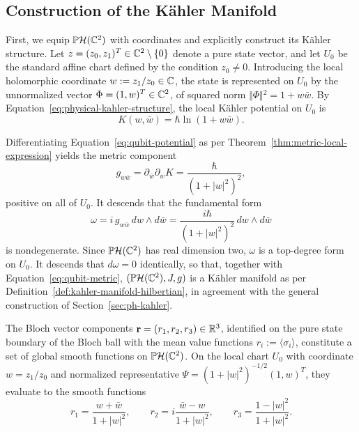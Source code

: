 \subsection*{Construction of the Kähler Manifold}

First, we equip $\PH(\C^2)$ with coordinates and explicitly construct its Kähler structure. Let $z = (z_0, z_1)^T \in \mathbb{C}^2 \setminus \{0\}$ denote a pure state vector, and let $U_0$ be the standard affine chart defined by the condition $z_0 \neq 0$. Introducing the local holomorphic coordinate $w := z_1/z_0 \in \mathbb{C}$, the state is represented on $U_0$ by the unnormalized vector $\Phi = (1, w)^T \in \mathbb{C}^2$, of squared norm $\Vert{}\Phi\Vert{}^2 = 1 + w\bar{w}$. By Equation~\eqref{eq:physical-kahler-structure}, the local Kähler potential on $U_0$ is
\begin{equation}
	K(w,\bar w)=\hbar\ln(1+w\bar w). \label{eq:qubit-potential}
\end{equation}

\noindent Differentiating Equation~\eqref{eq:qubit-potential} as per Theorem~\ref{thm:metric-local-expression} yields the metric component
\begin{equation}
	g_{w\bar w}=\partial_{\bar w}\partial_w K=\frac{\hbar}{(1+|w|^2)^2}, \label{eq:qubit-metric}
\end{equation}
positive on all of $U_0$. It descends that the fundamental form
\begin{equation}
	\boxed{\omega=i\,g_{w\bar w}\,dw\wedge d\bar w=\frac{i\hbar}{(1+|w|^2)^2}\,dw\wedge d\bar w} \label{eq:qubit-omega}
\end{equation}
is nondegenerate. Since $\PH(\C^2)$ has real dimension two, $\omega$ is a top-degree form on $U_0$. It descends that $d\omega=0$ identically, so that, together with Equation~\eqref{eq:qubit-metric}, $(\PH(\C^2),J,g)$ is a Kähler manifold as per Definition~\ref{def:kahler-manifold-hilbertian}, in agreement with the general construction of Section~\ref{sec:ph-kahler}.

\noindent The Bloch vector components $\mathbf{r}=(r_1,r_2,r_3) \in \mathbb{R}^3$, identified on the pure state boundary of the Bloch ball with the mean value functions $r_i := \langle\sigma_i\rangle$,  constitute a set of global smooth functions on $\PH(\mathbb{C}^2)$. On the local chart $U_0$ with coordinate $w = z_1/z_0$ and normalized representative $\Psi = (1+|w|^2)^{-1/2} (1, w)^T$, they evaluate to the smooth functions
\begin{equation}
	r_1 = \frac{w + \bar{w}}{1+|w|^2}, \qquad r_2 = i\frac{\bar{w} - w}{1+|w|^2}, \qquad r_3 = \frac{1 - |w|^2}{1+|w|^2}.
\end{equation}

